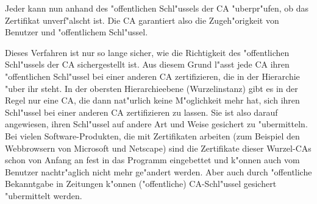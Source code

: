 Jeder kann nun anhand des "offentlichen Schl"ussels der CA "uberpr"ufen, ob
das Zertifikat unverf"alscht ist. Die CA garantiert also die Zugeh"origkeit
von Benutzer und "offentlichem Schl"ussel.

Dieses Verfahren ist nur so lange sicher, wie die Richtigkeit des
"offentlichen Schl"ussels der CA sichergestellt ist. Aus diesem Grund l"asst
jede CA ihren "offentlichen Schl"ussel bei einer anderen CA zertifizieren,
die in der Hierarchie "uber ihr steht. In der obersten Hierarchieebene
(Wurzelinstanz) gibt es in der Regel nur eine CA, die dann nat"urlich keine
M"oglichkeit mehr hat, sich ihren Schl"ussel bei einer anderen CA
zertifizieren zu lassen. Sie ist also darauf angewiesen, ihren Schl"ussel
auf andere Art und Weise gesichert zu "ubermitteln. Bei vielen
Software-Produkten, die mit Zertifikaten arbeiten (zum Beispiel den
Webbrowsern von Microsoft und Netscape) sind die Zertifikate dieser
Wurzel-CAs schon von Anfang an fest in das Programm eingebettet und k"onnen
auch vom Benutzer nachtr"aglich nicht mehr ge"andert werden. Aber auch durch
"offentliche Bekanntgabe in Zeitungen k"onnen ("offentliche) CA-Schl"ussel
gesichert "ubermittelt werden.



